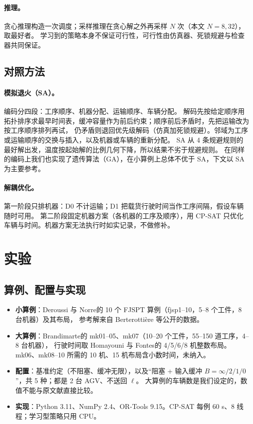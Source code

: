 \documentclass[11pt,a4paper]{ctexart}
\theoremstyle{definition}
\theoremstyle{remark}
\newcommand{\LU}{\ell}
\begin{document}
\paragraph{推理。}贪心推理构造一次调度；采样推理在贪心解之外再采样 $N$ 次（本文 $N=8,32$），取最好者。
学习到的策略本身不保证可行性，可行性由仿真器、死锁规避与检查器共同保证。

\subsection{对照方法}

\paragraph{模拟退火（SA）。}编码分四段：工序顺序、机器分配、运输顺序、车辆分配。
解码先按给定顺序用拓扑排序求最早时间表，缓冲容量作为前后约束；顺序前后矛盾时，先把运输改为按工序顺序排列再试，
仍矛盾则退回优先级解码（仿真加死锁规避）。邻域为工序或运输顺序的交换与插入，以及机器或车辆的重新分配。
SA 从 4 条规避规则的最好解出发，温度按起始解的比例几何下降，所以结果不劣于规避规则。
在同样的编码上我们也实现了遗传算法（GA），在小算例上总体不优于 SA，下文以 SA 为主要参考。

\paragraph{解耦优化。}第一阶段只排机器：D0 不计运输；D1 把载货行驶时间当作工序间隔，假设车辆随时可用。
第二阶段固定机器方案（各机器的工序及顺序），用 CP-SAT 只优化车辆与时间。机器方案无法执行时如实记录，不做修补。

\section{实验}\label{sec:exp}

\subsection{算例、配置与实现}

\begin{itemize}[nosep]
  \item \textbf{小算例}：Deroussi 与 Norre\cite{deroussi2010}的 10 个 FJSPT 算例（fjsp1--10，5--8 个工件，8 台机器）及其布局，
        参考解来自 Berterottière 等\cite{berterottiere2024}公开的数据。
  \item \textbf{大算例}：Brandimarte\cite{brandimarte1993}的 mk01--05、mk07（10--20 个工件，55--150 道工序，4--8 台机器），
        行驶时间取 Homayouni 与 Fontes\cite{homayouni2021}的 4/5/6/8 机整数布局。mk06、mk08--10 所需的 10 机、15 机布局含小数时间，未纳入。
  \item \textbf{配置}：基准约定（不阻塞、缓冲无限），以及“阻塞 + 输入缓冲 $B=\infty/2/1/0$”，共 5 种；都是 2 台 AGV、不送回 $\LU$。
        大算例的车辆数是我们设定的，数值不能与原文献直接比较。
  \item \textbf{实现}：Python 3.11、NumPy 2.4、OR-Tools 9.15。CP-SAT 每例 60 s、8 线程；学习型策略只用 CPU。
\end{itemize}
\end{document}
